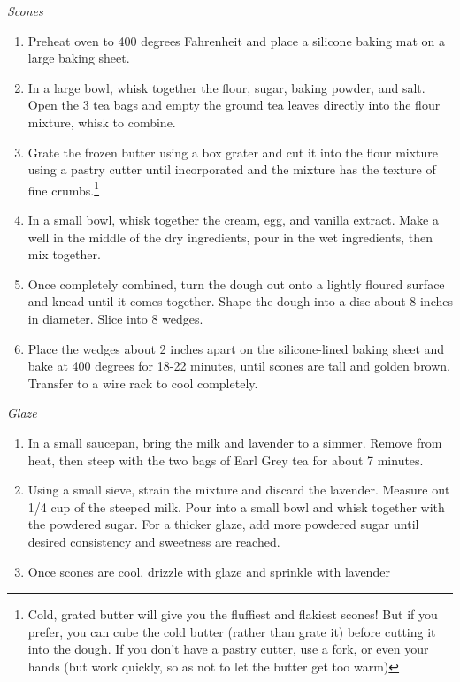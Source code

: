 \instructions
\textit{Scones}
\begin{enumerate}
    \item Preheat oven to 400 degrees Fahrenheit and place a silicone baking mat on a large baking sheet.
    \item In a large bowl, whisk together the flour, sugar, baking powder, and salt. 
        Open the 3 tea bags and empty the ground tea leaves directly into the flour mixture, whisk to combine.
    \item Grate the frozen butter using a box grater and cut it into the flour
    mixture using a pastry cutter until incorporated and the mixture has the
    texture of fine crumbs.\footnote{Cold, grated butter will give you the
    fluffiest and flakiest scones! But if you prefer, you can cube the cold
    butter (rather than grate it) before cutting it into the dough. If you don’t
    have a pastry cutter, use a fork, or even your hands (but work quickly, so
    as not to let the butter get too warm)}
    \item In a small bowl, whisk together the cream, egg, and vanilla extract.
    Make a well in the middle of the dry ingredients, pour in the wet
    ingredients, then mix together.
    \item Once completely combined, turn the dough out onto a lightly floured
    surface and knead until it comes together. Shape the dough into a disc about
    8 inches in diameter. Slice into 8 wedges.
    \item Place the wedges about 2 inches apart on the silicone-lined baking
    sheet and bake at 400 degrees for 18-22 minutes, until scones are tall and
    golden brown. Transfer to a wire rack to cool completely.
\end{enumerate}

\textit{Glaze}
\begin{enumerate}
    \item In a small saucepan, bring the milk and lavender to a simmer. Remove from heat, then steep with the two bags of Earl Grey tea for about 7 minutes.
    \item Using a small sieve, strain the mixture and discard the lavender. Measure out 1/4 cup of the steeped milk. Pour into a small bowl and whisk together with the powdered sugar. For a thicker glaze, add more powdered sugar until desired consistency and sweetness are reached.
    \item Once scones are cool, drizzle with glaze and sprinkle with lavender
\end{enumerate}